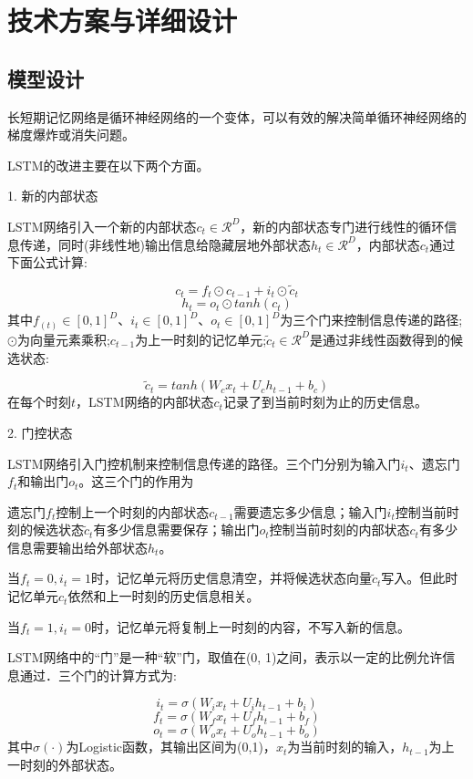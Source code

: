 \documentclass{article}
\begin{document}
\section{技术方案与详细设计}

\subsection{模型设计}
长短期记忆网络是循环神经网络的一个变体，可以有效的解决简单循环神经网络的梯度爆炸或消失问题。 \par
LSTM的改进主要在以下两个方面。  \par
1. 新的内部状态\par
LSTM网络引入一个新的内部状态$c_{t}{\in}\mathcal{R}^{D}$，新的内部状态专门进行线性的循环信息传递，同时(非线性地)输出信息给隐藏层地外部状态$h_{t}{\in}\mathcal{R}^D$，内部状态$c_{t}$通过下面公式计算:\par
$$c_{t}=f_{t}{\odot}c_{t-1}+i_{t}{\odot}\widetilde{c}_{t}$$
$$h_{t}=o_{t}{\odot}tanh(c_{t})$$
其中${f_{(t)}}{\in}{[0,1]}^{D}$、$i_{t}{\in}{[0,1]}^D$、$o_{t}{\in}{[0,1]}^D$为三个门来控制信息传递的路径;$\odot$为向量元素乘积;$c_{t-1}$为上一时刻的记忆单元;$\widetilde{c}_{t}{\in}\mathcal{R}^{D}$是通过非线性函数得到的候选状态:  \par
$$\widetilde{c}_{t}=tanh(W_{c}x_{t}+U_{c}h_{t-1}+b_{c})$$
在每个时刻$t$，LSTM网络的内部状态$c_{t}$记录了到当前时刻为止的历史信息。  \par

2. 门控状态\par
LSTM网络引入门控机制来控制信息传递的路径。三个门分别为输入门$i_{t}$、遗忘门$f_{t}$和输出门$o_{t}$。这三个门的作用为  \par
遗忘门$f_{t}$控制上一个时刻的内部状态$c_{t-1}$需要遗忘多少信息；输入门$i_{t}$控制当前时刻的候选状态$\widetilde{c}_{t}$有多少信息需要保存；输出门$o_{t}$控制当前时刻的内部状态$c_{t}$有多少信息需要输出给外部状态$h_{t}$。\par

当$f_{t}=0,i_{t}=1$时，记忆单元将历史信息清空，并将候选状态向量$\widetilde{c}_{t}$写入。但此时记忆单元$c_{t}$依然和上一时刻的历史信息相关。  \par
当$f_{t}=1,i_{t}=0$时，记忆单元将复制上一时刻的内容，不写入新的信息。  \par


LSTM网络中的“门”是一种“软”门，取值在(0, 1)之间，表示以一定的比例允许信息通过．三个门的计算方式为: \par
$$i_{t}=\sigma(W_{i}x_{t}+U_{i}h_{t-1}+b_{i})$$
$$f_{t}=\sigma(W_{f}x_{t}+U_{f}h_{t-1}+b_{f})$$
$$o_{t}=\sigma(W_{o}x_{t}+U_{o}h_{t-1}+b_{o})$$
其中$\sigma(\cdot)$为Logistic函数，其输出区间为(0,1)，$x_{t}$为当前时刻的输入，$h_{t-1}$为上一时刻的外部状态。  \par
\end{document}
